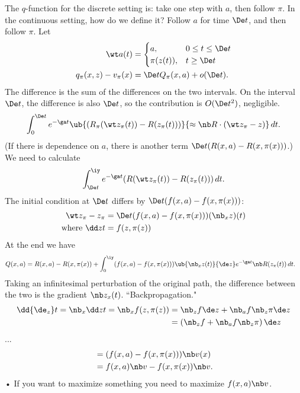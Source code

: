 The $q$-function for the discrete setting is: take one step with $a$, then follow $\pi$. In the continuous setting, how do we define it? Follow $a$ for time $\De t$, and then follow $\pi$. Let
\begin{align}
\wt a(t)&= \begin{cases}
a, &0\le t\le \De t\\
\pi(z(t)),&t\ge \De t
\end{cases}\\
q_\pi(x,z) - v_\pi(x)  &= \De t Q_\pi(x,a) + o(\De t).
\end{align}
The difference is the sum of the differences on the two intervals. On the interval $\De t$, the difference is also $\De t$, so the contribution is $O(\De t^2)$, negligible. 
\begin{align}\int_0^{\De t}e^{-\ga t}\ub{(R_\pi(\wt z_\pi(t)) - R(z_\pi(t)))}{\approx \nb R\cdot (\wt z_\pi -z)}\,dt.
\end{align}
(If there is dependence on $a$, there is another term $\De t (R(x,a)-R(x,\pi(x)))$.)
We need to calculate
\begin{align}
\int_{\De t}^\iy e^{-\ga t} 
(R(\wt z_\pi(t)) - R(z_\pi(t)))\,dt.
\end{align}
The initial condition at $\De t$ differs by $\De t (f(x,a) - f(x,\pi(x)))$:
\begin{align}
\wt z_\pi - z_\pi &= 
\De t(f(x,a) - f(x,\pi(x))) 
(\nb_x z)(t)\\
\text{where }\dd zt &= f(z,\pi(z))
\end{align}
At the end we have
\begin{align}
Q(x,a) &= R(x,a) - R(x,\pi(x))
+ \int_0^\iy (f(x,a) - f(x,\pi(x)))
\ub{\nb_x z(t)}{\de z}e^{-\ga t} \nb R(z_\pi(t))\,dt.
\end{align}
Taking an infinitesimal perturbation of the original path, the difference between the two is the gradient $\nb z_x(t)$.
``Backpropagation."
%
\begin{align}
\dd{\de_z}t = \nb_x \dd zt = 
\nb_x f(z,\pi(z)) &=\nb_z f\de z + \nb_a f\nb_z\pi \de z\\
&=(\nb_z f +\nb_a f\nb_z\pi)\,\de z
\end{align}
...
\begin{align}
&=(f(x,a)- f(x,\pi(x))) \nb v(x)\\
&=f(x,a) \nb v - f(x,\pi(x))\nb v.
\end{align}•
If you want to maximize something you need to maximize $f(x,a)\nb v$.

